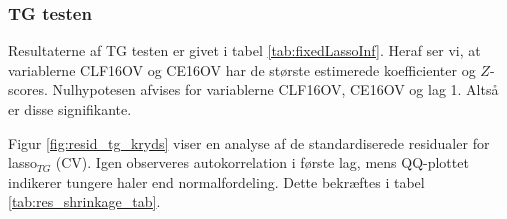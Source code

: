 \subsubsection{TG testen}
Resultaterne af TG testen er givet i tabel \ref{tab:fixedLassoInf}.
Heraf ser vi, at variablerne \textcolor{blue3}{CLF16OV} og \textcolor{blue3}{CE16OV} har de største estimerede koefficienter og $Z$-scores.
Nulhypotesen afvises for variablerne \textcolor{blue3}{CLF16OV}, \textcolor{blue3}{CE16OV} og \textcolor{blue3}{lag 1}. Altså er disse signifikante.

Figur \ref{fig:resid_tg_kryds} viser en analyse af de standardiserede residualer for lasso$_{TG}$ (CV). 
Igen observeres autokorrelation i første lag, mens QQ-plottet indikerer tungere haler end normalfordeling. 
Dette bekræftes i tabel \ref{tab:res_shrinkage_tab}.


%
